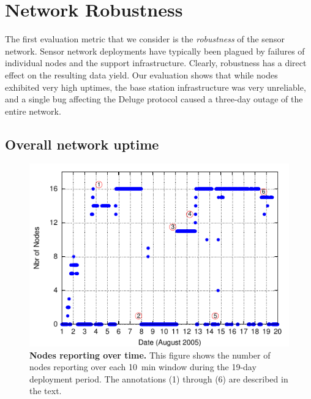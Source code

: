 \section{Network Robustness}
\label{evaluation-sec-robustness}

The first evaluation metric that we consider is the {\em robustness} of the
sensor network.  Sensor network deployments have typically been plagued by
failures of individual nodes and the support infrastructure. Clearly,
robustness has a direct effect on the resulting data yield.  Our evaluation
shows that while nodes exhibited very high uptimes, the base station
infrastructure was very unreliable, and a single bug affecting the Deluge
protocol caused a three-day outage of the entire network.


\subsection{Overall network uptime}

\begin{figure}[t]
\label{evaluation-fig-nodesalive}
\begin{center}
\includegraphics[width=\hsize]{./5-evaluation/figs/robustness/nodesalive/nodesalive.pdf}
\end{center}
\caption{\textbf{Nodes reporting over time.}
This figure shows the number of nodes reporting over each 10~min window
during the 19-day deployment period.  The annotations (1) through (6) are
described in the text.}
\end{figure}

